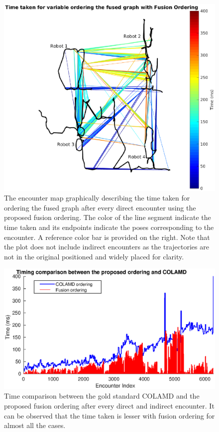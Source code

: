 \begin{figure}
\centering
\includegraphics[width=\textwidth]{Chapters/figures6/fusion_ordering_encounter_colored}
\caption{The encounter map graphically describing the time taken for ordering the fused graph after every direct encounter using the proposed fusion ordering. The color of the line segment indicate the time taken and its endpoints indicate the poses corresponding to the encounter. A reference color bar is provided on the right. Note that the plot does not include indirect encounters as the trajectories are not in the original positioned and widely placed for clarity.}
\label{fig:encounter_fusion}
\end{figure}

\begin{figure}
\centering
\includegraphics[width=\textwidth]{Chapters/figures6/time_fusion_vs_colamd}
\caption{Time comparison between the gold standard COLAMD and the proposed fusion ordering after every direct and indirect encounter. It can be observed that the time taken is lesser with fusion ordering for almost all the cases.}
\label{fig:fusion_vs_colamd}
\end{figure}

